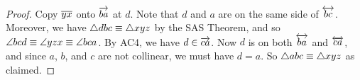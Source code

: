 \begin{proof}
Copy \(\overline{yx}\) onto \(\overrightarrow{ba}\) at \(d\).
Note that \(d\) and \(a\) are on the same side of \(\overleftrightarrow{bc}\).
Moreover, we have \(\bigtriangleup{dbc} \equiv \bigtriangleup{xyz}\) by the SAS Theorem, and so \(\angle{bcd} \equiv \angle{yzx} \equiv \angle{bca}\).
By AC4, we have \(d \in \overrightarrow{ca}\).
Now \(d\) is on both \(\overleftrightarrow{ba}\) and \(\overleftrightarrow{ca}\), and since \(a\), \(b\), and \(c\) are not collinear, we must have \(d = a\).
So \(\bigtriangleup{abc} \equiv \bigtriangleup{xyz}\) as claimed.
\end{proof}
